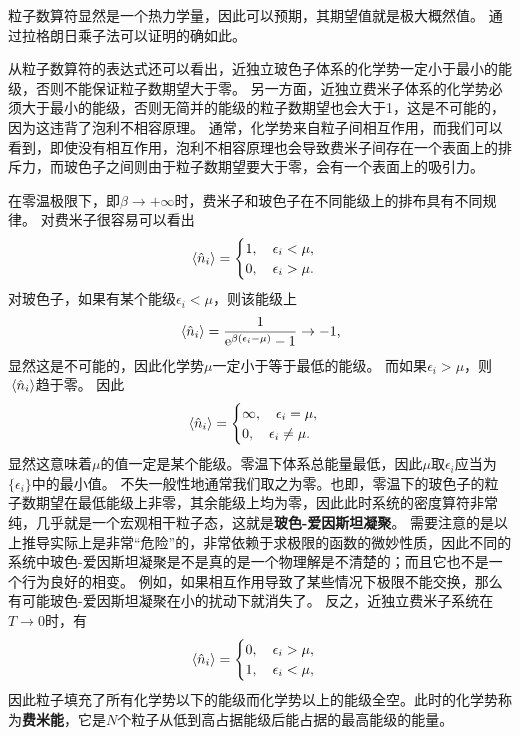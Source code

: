 \documentclass[hyperref, UTF8, a4paper]{ctexart}
\newcommand*{\ee}{\mathrm{e}}
\begin{document}
粒子数算符显然是一个热力学量，因此可以预期，其期望值就是极大概然值。
通过拉格朗日乘子法可以证明的确如此。

从粒子数算符的表达式还可以看出，近独立玻色子体系的化学势一定小于最小的能级，否则不能保证粒子数期望大于零。
另一方面，近独立费米子体系的化学势必须大于最小的能级，否则无简并的能级的粒子数期望也会大于1，这是不可能的，因为这违背了泡利不相容原理。
通常，化学势来自粒子间相互作用，而我们可以看到，即使没有相互作用，泡利不相容原理也会导致费米子间存在一个表面上的排斥力，而玻色子之间则由于粒子数期望要大于零，会有一个表面上的吸引力。

在零温极限下，即$\beta \to + \infty$时，费米子和玻色子在不同能级上的排布具有不同规律。
对费米子很容易可以看出
\begin{equation}
    \expval*{\hat{n}_i} = \begin{cases}
        1, \quad \epsilon_i < \mu, \\
        0, \quad \epsilon_i > \mu.
    \end{cases}
\end{equation}
对玻色子，如果有某个能级$\epsilon_i < \mu$，则该能级上
\[
    \expval*{\hat{n}_i} = \frac{1}{\ee^{  \beta (\epsilon_i - \mu)} - 1} \to -1,
\]
显然这是不可能的，因此化学势$\mu$一定小于等于最低的能级。
而如果$\epsilon_i > \mu$，则$\expval*{\hat{n}_i}$趋于零。
因此
\[
    \expval*{\hat{n}_i} = \begin{cases}
        \infty, \quad \epsilon_i = \mu, \\
        0, \quad \epsilon_i \neq \mu.
    \end{cases}
\]
显然这意味着$\mu$的值一定是某个能级。零温下体系总能量最低，因此$\mu$取$\epsilon_i$应当为$\{\epsilon_i\}$中的最小值。
不失一般性地通常我们取之为零。也即，零温下的玻色子的粒子数期望在最低能级上非零，其余能级上均为零，因此此时系统的密度算符非常纯，几乎就是一个宏观相干粒子态，这就是\textbf{玻色-爱因斯坦凝聚}。
需要注意的是以上推导实际上是非常“危险”的，非常依赖于求极限的函数的微妙性质，因此不同的系统中玻色-爱因斯坦凝聚是不是真的是一个物理解是不清楚的；而且它也不是一个行为良好的相变。
例如，如果相互作用导致了某些情况下极限不能交换，那么有可能玻色-爱因斯坦凝聚在小的扰动下就消失了。
反之，近独立费米子系统在$T\to 0$时，有
\[
    \expval*{\hat{n}_i} = \begin{cases}
        0, \quad \epsilon_i > \mu, \\
        1, \quad \epsilon_i < \mu, 
    \end{cases}
\]
因此粒子填充了所有化学势以下的能级而化学势以上的能级全空。此时的化学势称为\textbf{费米能}，它是$N$个粒子从低到高占据能级后能占据的最高能级的能量。
\end{document}
